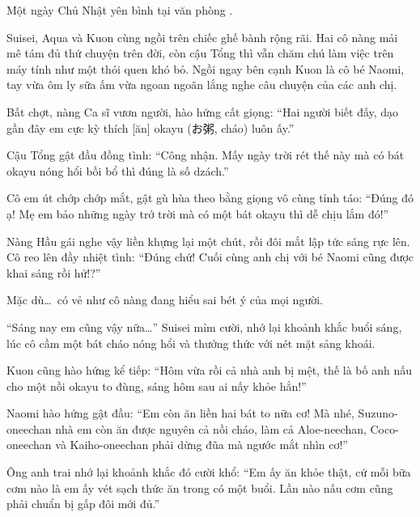 \documentclass[../main.tex]{subfiles}
\begin{document}

Một ngày Chủ Nhật yên bình tại văn phòng \hll.

Suisei, Aqua và Kuon cùng ngồi trên chiếc ghế bành rộng rãi. Hai cô nàng mải mê tám đủ thứ chuyện trên đời, còn cậu Tổng thì vẫn chăm chú làm việc trên máy tính như một thói quen khó bỏ. Ngồi ngay bên cạnh Kuon là cô bé Naomi, tay vừa ôm ly sữa ấm vừa ngoan ngoãn lắng nghe câu chuyện của các anh chị.

Bất chợt, nàng Ca sĩ vươn người, hào hứng cất giọng: ``Hai người biết đấy, dạo gần đây em cực kỳ thích [ăn] okayu (お粥, cháo) luôn ấy.''

Cậu Tổng gật đầu đồng tình: ``Công nhận. Mấy ngày trời rét thế này mà có bát okayu nóng hổi bồi bổ thì đúng là số dzách.''

Cô em út chớp chớp mắt, gật gù hùa theo bằng giọng vô cùng tỉnh táo: ``Đúng đó ạ! Mẹ em bảo những ngày trở trời mà có một bát okayu thì dễ chịu lắm đó!''

Nàng Hầu gái nghe vậy liền khựng lại một chút, rồi đôi mắt lập tức sáng rực lên. Cô reo lên đầy nhiệt tình: ``Đúng chứ! Cuối cùng anh chị với bé Naomi cũng được khai sáng rồi hử!?''

Mặc dù\dots\ có vẻ như cô nàng đang hiểu sai bét ý của mọi người.

``Sáng nay em cũng vậy nữa\dots'' Suisei mỉm cười, nhớ lại khoảnh khắc buổi sáng, lúc cô cầm một bát cháo nóng hổi và thưởng thức với nét mặt sảng khoái.


Kuon cũng hào hứng kể tiếp: ``Hôm vừa rồi cả nhà anh bị mệt, thế là bố anh nấu cho một nồi okayu to đùng, sáng hôm sau ai nấy khỏe hẳn!''

Naomi hào hứng gật đầu: ``Em còn ăn liền hai bát to nữa cơ! Mà nhé, Suzuno-oneechan nhà em còn ăn được nguyên cả nồi cháo, làm cả Aloe-neechan, Coco-oneechan và Kaiho-oneechan phải dừng đũa mà ngước mắt nhìn cơ!''

Ông anh trai nhớ lại khoảnh khắc đó cười khổ: ``Em ấy ăn khỏe thật, cứ mỗi bữa cơm nào là em ấy vét sạch thức ăn trong có một buổi. Lần nào nấu cơm cũng phải chuẩn bị gấp đôi mới đủ.''
\end{document}
